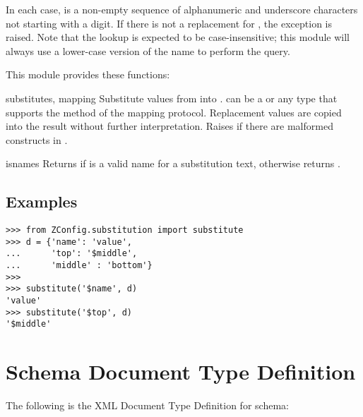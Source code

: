 \documentclass{howto}
\begin{document}
In each case,  is a non-empty sequence of alphanumeric and
underscore characters not starting with a digit.  If there is not a
replacement for , the exception
 is raised.
Note that the lookup is expected to be case-insensitive; this module
will always use a lower-case version of the name to perform the query.

This module provides these functions:

\begin{funcdesc}{substitute}{s, mapping}
  Substitute values from  into .  
  can be a  or any type that supports the 
  method of the mapping protocol.  Replacement
  values are copied into the result without further interpretation.
  Raises  if there are malformed
  constructs in .
\end{funcdesc}

\begin{funcdesc}{isname}{s}
  Returns  if  is a valid name for a substitution
  text, otherwise returns .
\end{funcdesc}


\subsection{Examples}

\begin{verbatim}
>>> from ZConfig.substitution import substitute
>>> d = {'name': 'value',
...      'top': '$middle',
...      'middle' : 'bottom'}
>>>
>>> substitute('$name', d)
'value'
>>> substitute('$top', d)
'$middle'
\end{verbatim}


\appendix
\section{Schema Document Type Definition \label{schema-dtd}}

The following is the XML Document Type Definition for 
schema:



%
\end{document}
